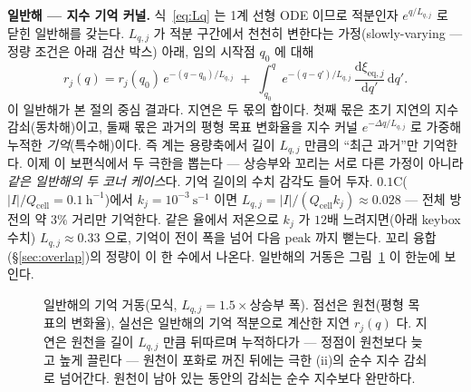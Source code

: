 \documentclass[11pt,a4paper]{article}
\newcommand{\dd}{\mathrm{d}}
\newcommand{\eq}{\mathrm{eq}}
\newcommand{\cell}{\mathrm{cell}}
\newcommand{\peak}{\mathrm{peak}}
\begin{document}
\textbf{일반해 — 지수 기억 커널.} 식~\eqref{eq:Lq} 는 1계 선형 ODE 이므로 적분인자 $e^{q/L_{q,j}}$ 로 닫힌
일반해를 갖는다. $L_{q,j}$ 가 적분 구간에서 천천히 변한다는 가정(slowly-varying — 정량 조건은 아래 검산 박스)
아래, 임의 시작점 $q_0$ 에 대해
\begin{equation*}
r_j(q)=r_j(q_0)\,e^{-(q-q_0)/L_{q,j}}
\;+\;\int_{q_0}^{q}e^{-(q-q')/L_{q,j}}\,\frac{\dd\xi_{\eq,j}}{\dd q'}\,\dd q'.
\end{equation*}
이 일반해가 본 절의 중심 결과다. 지연은 두 몫의 합이다. 첫째 몫은 초기 지연의 지수 감쇠(동차해)이고, 둘째 몫은
과거의 평형 목표 변화율을 지수 커널 $e^{-\Delta q/L_{q,j}}$ 로 가중해 누적한 \emph{기억}(특수해)이다. 즉 계는
용량축에서 길이 $L_{q,j}$ 만큼의 ``최근 과거''만 기억한다. 이제 이 보편식에서 두 극한을 뽑는다 — 상승부와 꼬리는
서로 다른 가정이 아니라 \emph{같은 일반해의 두 코너 케이스}다. 기억 길이의 수치 감각도 들어 두자.
$0.1$C($|I|/Q_\cell=0.1\ \mathrm h^{-1}$)에서 $k_j=10^{-3}\ \mathrm s^{-1}$ 이면
$L_{q,j}=|I|/(Q_\cell k_j)\approx0.028$ — 전체 방전의 약 $3\%$ 거리만 기억한다. 같은 율에서 저온으로
$k_j$ 가 $12$배 느려지면(아래 keybox 수치) $L_{q,j}\approx0.33$ 으로, 기억이 전이 폭을 넘어 다음 peak
까지 뻗는다. 꼬리 융합(\S\ref{sec:overlap})의 정량이 이 한 수에서 나온다. 일반해의 거동은 그림~\ref{fig:kernel} 이
한눈에 보인다.
\begin{figure}[t]
\centering
{}
\caption{일반해의 기억 거동(모식, $L_{q,j}=1.5\times$상승부 폭). 점선은 원천(평형 목표의 변화율), 실선은
일반해의 기억 적분으로 계산한 지연 $r_j(q)$ 다. 지연은 원천을 길이 $L_{q,j}$ 만큼 뒤따르며 누적하다가 —
정점이 원천보다 늦고 높게 끌린다 — 원천이 포화로 꺼진 뒤에는 극한 (ii)의 순수 지수 감쇠로 넘어간다. 원천이
남아 있는 동안의 감쇠는 순수 지수보다 완만하다.}
\label{fig:kernel}
\end{figure}
\end{document}
